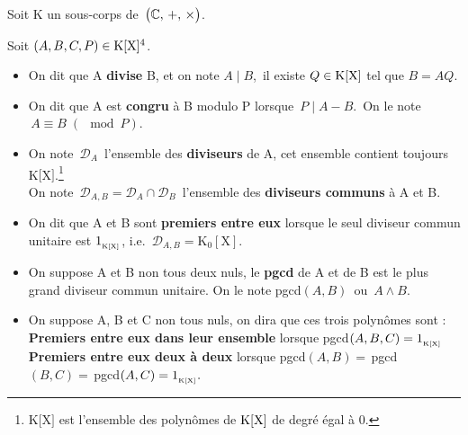 \vspace{0.5cm}

\begin{center}
    Soit K un sous-corps de $\,\bigl(\mathbb{C},\,+,\,\times\bigr)$.
\end{center}

\vspace{0.3cm}

Soit \((A,B,C,P)\in \text{K}[\text{X}]^4\).
\begin{itemize}[leftmargin=0.5cm, label=•]
    \item On dit que A \textbf{divise} B, et on note $A\mid B$,\, \ssi il existe $Q\in \text{K}[\text{X}]$ tel que $B=AQ$.
    
    \item On dit que A est \textbf{congru} à B modulo P lorsque \(\,P\mid A-B.\)\, On le note \(\, A\equiv B\; (\!\!\!\!\mod P)\).
    
    \item On note \(\,\mathcal{D}_A\,\) l'ensemble des \textbf{diviseurs} de A, cet ensemble contient toujours\, K$[$X$]$.\footnote{K$[$X$]$ est l'ensemble des polynômes de $\text{K}[\text{X}]$ de degré égal à $0$.}\\
    On note \(\,\mathcal{D}_{A,B}=\mathcal{D}_A\cap\mathcal{D}_B\,\) l'ensemble des \textbf{diviseurs communs} à A et B.

    \item On dit que A et B sont \textbf{premiers entre eux} lorsque le seul diviseur commun unitaire est $1_{_{\text{K}[\text{X}]}}$, i.e. \(\,\mathcal{D}_{A,B}=\text{K}_0[\text{X}]\).
    
    \item On suppose A et B non tous deux nuls, le \textbf{pgcd} de A et de B est le plus grand diviseur commun unitaire. On le note pgcd$(A,B)\,$ ou $\,A\land B$.
    
    \item On suppose A, B et C non tous nuls, on dira que ces trois polynômes sont : \\
    \textbf{Premiers entre eux dans leur ensemble} lorsque pgcd$(A,B,C)=1_{_{\text{K}[\text{X}]}}$\\
    \textbf{Premiers entre eux deux à deux} lorsque pgcd$(A,B)=\,$pgcd$(B,C)=\,$pgcd$(A,C)=1_{_{\text{K}[\text{X}]}}.$


\end{itemize}
